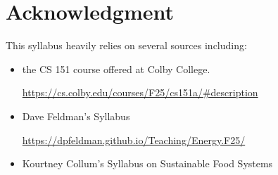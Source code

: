 \documentclass[12pt]{article}
\begin{document}
\section{Acknowledgment}
This syllabus heavily relies on several sources including:
\begin{itemize}
\item the CS 151 course offered at Colby College.

  \footnotesize{\url{https://cs.colby.edu/courses/F25/cs151a/#description}}

\item \normalsize{Dave Feldman's Syllabus}

  \footnotesize{\url{https://dpfeldman.github.io/Teaching/Energy.F25/}}

  
\item \normalsize{Kourtney Collum's Syllabus on Sustainable Food Systems}
\end{itemize}
\end{document}
